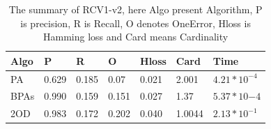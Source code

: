 \begin{table}[h]
\caption{The summary of RCV1-v2, here Algo present Algorithm, P is  precision, R is Recall, O denotes OneError, Hloss is Hamming loss and Card means Cardinality}
\label{table:rcv1}
\begin{center}
\begin{tabular}{lllllll}
{\bf Algo}  & {\bf P} & {\bf R} & {\bf O}& {\bf Hloss} & {\bf Card} & {\bf Time}\\
\hline
PA & 0.629 & 0.185 & 0.07 & 0.021 & 2.001 & $4.21*10^{-4}$\\

BPAs & 0.990 & 0.159 & 0.151 & 0.027 & 1.37 & $5.37*10{-4}$\\

2OD & 0.983 & 0.172 & 0.202 & 0.040 & 1.0044 & $2.13*10^{-1}$\\
\end{tabular}
\end{center}
\end{table}

